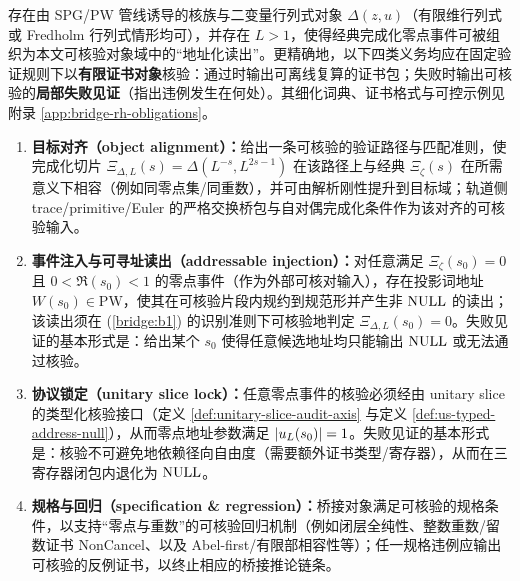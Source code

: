 \begin{assumption}\label{ass:bridge-rh}
存在由 SPG/PW 管线诱导的核族与二变量行列式对象 $\Delta(z,u)$（有限维行列式或 Fredholm 行列式情形均可），并存在 $L>1$，使得经典完成化零点事件可被组织为本文可核验对象域中的“地址化读出”。更精确地，以下四类义务均应在固定验证规则下以\textnormal{\textbf{有限证书对象}}核验：通过时输出可离线复算的证书包；失败时输出可核验的\textnormal{\textbf{局部失败见证}}（指出违例发生在何处）。其细化词典、证书格式与可控示例见附录 \ref{app:bridge-rh-obligations}。
\begin{enumerate}[label=(B\arabic*), ref=B\arabic*]
  \item \label{bridge:b1}
  \textnormal{\textbf{目标对齐（object alignment）：}}给出一条可核验的验证路径与匹配准则，使完成化切片 $\Xi_{\Delta,L}(s)=\Delta(L^{-s},L^{2s-1})$ 在该路径上与经典 $\Xi_\zeta(s)$ 在所需意义下相容（例如同零点集/同重数），并可由解析刚性提升到目标域；轨道侧 trace/primitive/Euler 的严格交换桥包与自对偶完成化条件作为该对齐的可核验输入。

  \item \label{bridge:b2}
  \textnormal{\textbf{事件注入与可寻址读出（addressable injection）：}}对任意满足 $\Xi_\zeta(s_0)=0$ 且 $0<\Re(s_0)<1$ 的零点事件（作为外部可核对输入），存在投影词地址 $W(s_0)\in\mathrm{PW}$，使其在可核验片段内规约到规范形并产生非 $\mathrm{NULL}$ 的读出；该读出须在 (\ref{bridge:b1}) 的识别准则下可核验地判定 $\Xi_{\Delta,L}(s_0)=0$。失败见证的基本形式是：给出某个 $s_0$ 使得任意候选地址均只能输出 $\mathrm{NULL}$ 或无法通过核验。

  \item \label{bridge:b3}
  \textnormal{\textbf{协议锁定（unitary slice lock）：}}任意零点事件的核验必须经由 unitary slice 的类型化核验接口（定义 \ref{def:unitary-slice-audit-axis} 与定义 \ref{def:us-typed-address-null}），从而零点地址参数满足 $\left\lvert u_L(s_0)\right\rvert=1$。失败见证的基本形式是：核验不可避免地依赖径向自由度（需要额外证书类型/寄存器），从而在三寄存器闭包内退化为 $\mathrm{NULL}$。

  \item \label{bridge:b4}
  \textnormal{\textbf{规格与回归（specification \& regression）：}}桥接对象满足可核验的规格条件，以支持“零点与重数”的可核验回归机制（例如闭层全纯性、整数重数/留数证书 NonCancel、以及 Abel-first/有限部相容性等）；任一规格违例应输出可核验的反例证书，以终止相应的桥接推论链条。
\end{enumerate}
\end{assumption}

